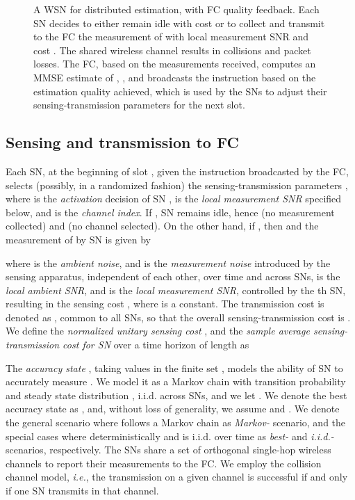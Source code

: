 \documentclass[10pt,twocolumn,twoside]{IEEEtran}
\theoremstyle{plain}
\begin{document}
\begin{figure}
{}
\vspace{-3mm}
\caption{{A WSN for distributed estimation, with FC quality feedback.
Each SN decides to either remain idle with cost  or to collect and transmit to the FC the measurement  of  with local measurement SNR  and cost . The shared wireless channel results in collisions and packet losses. The FC, 
based on the measurements received, computes an MMSE estimate of , , and broadcasts the instruction  based on the estimation quality 
achieved,
which is used by the SNs to adjust their sensing-transmission parameters for the next slot.}}\label{fig:WSN}
\vspace{-5mm}
\end{figure}
 \vspace{-3mm}
\subsection{Sensing and transmission to FC}
 \label{ph2}
\noindent  Each SN, at the beginning of slot , given the instruction  broadcasted by the FC,
  selects (possibly, in a randomized fashion) 
  the sensing-transmission parameters , 
 where  is the \emph{activation} decision of SN ,
  is the \emph{local measurement SNR} specified below, and  is the \emph{channel index}.
 {If , SN  remains idle, hence  (no measurement collected) and  (no channel selected).
On the other hand, if , then  and
 the measurement of  by SN  is given by}

where  is the \emph{ambient noise},
and  is the \emph{measurement noise} introduced by the sensing apparatus,
independent of each other, over time and across SNs,
   is the  \emph{local ambient SNR}, and  is the
   \emph{local measurement SNR}, controlled by the th SN, resulting in the sensing cost , where  is a constant.
   The transmission cost is denoted as , common to all SNs,
   so that the overall sensing-transmission cost
is .
We define the \emph{normalized unitary sensing cost} , and
 the \emph{sample average sensing-transmission cost for SN } over a time horizon of length  as



The \emph{accuracy state} , taking values in the finite set , models the ability of SN  to accurately measure .
We model it as a Markov chain with transition probability  and steady state distribution ,
i.i.d. across SNs, and we let .
  We denote the best accuracy state as ,
and, without loss of generality, we assume  and .
 We denote the general scenario where  follows a Markov chain as \emph{Markov-} scenario,
and the special cases where   deterministically 
and  is i.i.d. over time as \emph{best-} and \emph{i.i.d.-} scenarios, respectively.
   The  SNs share 
 a set of  orthogonal single-hop wireless channels to report their measurements to the FC.
 We employ the collision channel model, \emph{i.e.},
 the transmission on a given channel is successful if and only if one SN transmits in that channel. 
\end{document}
